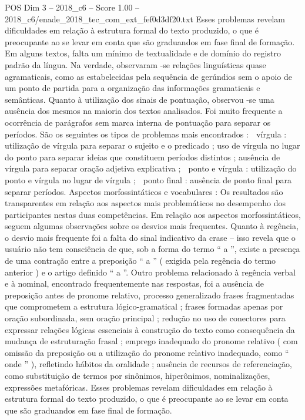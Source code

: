 \begin{textsample}{POS Dim 3 – 2018\_c6 – Score 1.00 – 2018\_c6/enade\_2018\_tec\_com\_ext\_fef0d3df20.txt}
Esses problemas revelam dificuldades em relação à estrutura formal do texto produzido, o que é preocupante ao se levar em conta que são graduandos em fase final de formação.
Em alguns textos, falta um mínimo de textualidade e de domínio do registro padrão da língua.
Na verdade, observaram -se relações linguísticas quase agramaticais, como as estabelecidas pela sequência de gerúndios sem o apoio de um ponto de partida para a organização das informações gramaticais e semânticas.
Quanto à utilização dos sinais de pontuação, observou -se uma ausência dos mesmos na maioria dos textos analisados.
Foi muito frequente a ocorrência de parágrafos sem marca interna de pontuação para separar os períodos.
São os seguintes os tipos de problemas mais encontrados :  vírgula : utilização de vírgula para separar o sujeito e o predicado ; uso de vírgula no lugar do ponto para separar ideias que constituem períodos distintos ; ausência de vírgula para separar oração adjetiva explicativa ;  ponto e vírgula : utilização do ponto e vírgula no lugar de vírgula ;  ponto final : ausência de ponto final para separar períodos.
Aspectos morfossintáticos e vocabulares : Os resultados são transparentes em relação aos aspectos mais problemáticos no desempenho dos participantes nestas duas competências.
Em relação aos aspectos morfossintáticos, seguem algumas observações sobre os desvios mais frequentes.
Quanto à regência, o desvio mais frequente foi a falta do sinal indicativo da crase – isso revela que o usuário não tem consciência de que, sob a forma do termo “ a ”, existe a presença de uma contração entre a preposição “ a ” ( exigida pela regência do termo anterior ) e o artigo definido “ a ”.
Outro problema relacionado à regência verbal e à nominal, encontrado frequentemente nas respostas, foi a ausência de preposição antes de pronome relativo, processo generalizado frases fragmentadas que comprometem a estrutura lógico-gramatical ; frases formadas apenas por oração subordinada, sem oração principal ; redução no uso de conectores para expressar relações lógicas essenciais à construção do texto como consequência da mudança de estruturação frasal ; emprego inadequado do pronome relativo ( com omissão da preposição ou a utilização do pronome relativo inadequado, como “ onde ” ), refletindo hábitos da oralidade ; ausência de recursos de referenciação, como substituição de termos por sinônimos, hiperônimos, nominalizações, expressões metafóricas.
Esses problemas revelam dificuldades em relação à estrutura formal do texto produzido, o que é preocupante ao se levar em conta que são graduandos em fase final de formação.

\end{textsample}

